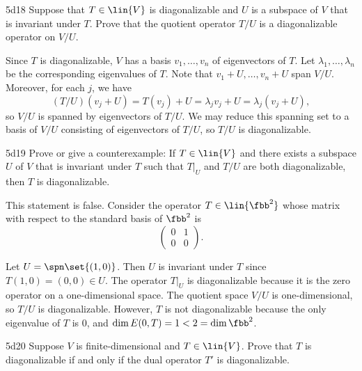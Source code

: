 \begin{exercise}{5d18}
    Suppose that $T \in \lin{V}$ is diagonalizable and $U$ is a subspace of $V$ that is invariant under $T$.
    Prove that the quotient operator $T/U$ is a diagonalizable operator on $V/U$.
\end{exercise}

\begin{sol}
    Since $T$ is diagonalizable, $V$ has a basis $v_1, \ldots, v_n$ of eigenvectors of $T$.
    Let $\lambda_1, \ldots, \lambda_n$ be the corresponding eigenvalues of $T$.
    Note that $v_1 + U, \ldots, v_n + U$ span $V/U$.
    Moreover, for each $j$, we have
    \[
        (T/U)(v_j + U) = T(v_j) + U = \lambda_j v_j + U = \lambda_j (v_j + U),
    \]
    so $V/U$ is spanned by eigenvectors of $T/U$.
    We may reduce this spanning set to a basis of $V/U$ consisting of eigenvectors of $T/U$, so $T/U$ is diagonalizable.
\end{sol}

\begin{exercise}{5d19}
    Prove or give a counterexample: If $T \in \lin{V}$ and there exists a subspace $U$ of $V$ that is invariant under $T$ such that $T|_U$ and $T/U$ are both diagonalizable, then $T$ is diagonalizable.

\end{exercise}

\begin{sol}
    This statement is false.
    Consider the operator $T \in \lin{\fbb^2}$ whose matrix with respect to the standard basis of $\fbb^2$ is
    \[
        \begin{pmatrix}
            0 & 1 \\
            0 & 0
        \end{pmatrix}.
    \]

    Let $U = \spn\set{(1, 0)}$.
    Then $U$ is invariant under $T$ since $T(1, 0) = (0, 0) \in U$.
    The operator $T|_U$ is diagonalizable because it is the zero operator on a one-dimensional space.
    The quotient space $V/U$ is one-dimensional, so $T/U$ is diagonalizable.
    However, $T$ is not diagonalizable because the only eigenvalue of $T$ is $0$, and $\dim E(0, T) = 1 < 2 = \dim \fbb^2$.
\end{sol}

\begin{exercise}{5d20}
    Suppose $V$ is finite-dimensional and $T \in \lin{V}$.
    Prove that $T$ is diagonalizable if and only if the dual operator $T'$ is diagonalizable.
\end{exercise}

